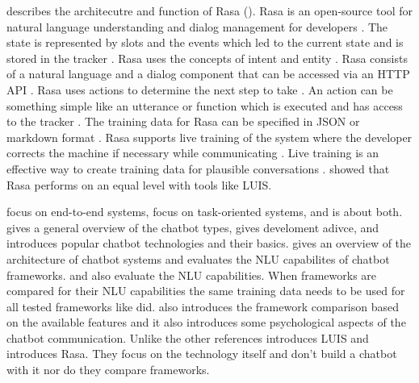 \citet{rasabocklisch2017} describes the architecutre and function of Rasa (\citet{singhbuilding, braunEvaluatingNLU, buiildChatbotsPython}).
Rasa is an open-source tool for natural language understanding and dialog management for developers \cite{rasabocklisch2017}.
The state is represented by slots and the events which led to the current state and is stored in the tracker \cite{rasabocklisch2017}. 
Rasa uses the concepts of intent and entity \cite{rasabocklisch2017}. 
Rasa consists of a natural language and a dialog component that can be accessed via an HTTP API \cite{rasabocklisch2017}.
Rasa uses actions to determine the next step to take \cite{rasabocklisch2017}. 
An action can be something simple like an utterance or function which is executed and has access to the tracker \cite{rasabocklisch2017}.
The training data for Rasa can be specified in JSON or markdown format \cite{rasabocklisch2017}.
Rasa supports live training of the system where the developer corrects the machine if necessary while communicating \cite{rasabocklisch2017}.
Live training is an effective way to create training data for plausible conversations \cite{rasabocklisch2017}.
\citet{braunEvaluatingNLU} showed that Rasa performs on an equal level with tools like LUIS.

\citet{evaluateChatbotsShawar2007,bordes2016learning,williams2017hybrid} 
focus on end-to-end systems, \citet{braunEvaluatingNLU, dutta2017developing,luis2015williams,rasabocklisch2017,pharmacybot,gregori2017evaluation}
focus on task-oriented systems, and \citet{singhbuilding} is about both.
\citet{singhbuilding} gives a general overview of the chatbot types, gives develoment adivce, and introduces 
popular chatbot technologies and their basics.
\citet{braunEvaluatingNLU} gives an overview of the architecture of chatbot systems and 
evaluates the NLU capabilites of chatbot frameworks.
\citet{gregori2017evaluation} and \citet{dutta2017developing} also evaluate the NLU capabilities.
When frameworks are compared for their NLU capabilities the same training data needs to be used for all tested frameworks 
like \citet{braunEvaluatingNLU,gregori2017evaluation} did.
\citet{dutta2017developing} also introduces the framework comparison based on the available features
and it also introduces some psychological aspects of the chatbot communication.
Unlike the other references \citet{luis2015williams} introduces LUIS and \citet{rasabocklisch2017} 
introduces Rasa. 
They focus on the technology itself and don't build a chatbot with it nor do they compare frameworks.

